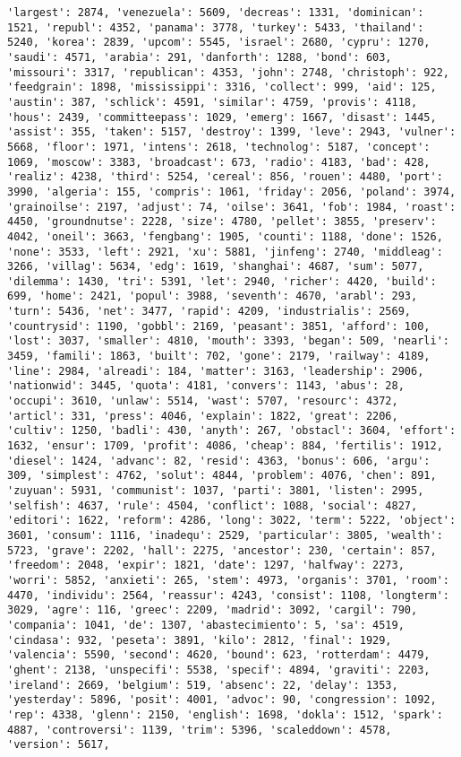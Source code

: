 \documentclass[11pt]{article}
\begin{document}
\begin{Verbatim}[commandchars=\\\{\}]
'largest': 2874, 'venezuela': 5609, 'decreas': 1331, 'dominican': 1521, 'republ': 4352, 'panama': 3778, 'turkey': 5433, 'thailand': 5240, 'korea': 2839, 'upcom': 5545, 'israel': 2680, 'cypru': 1270, 'saudi': 4571, 'arabia': 291, 'danforth': 1288, 'bond': 603, 'missouri': 3317, 'republican': 4353, 'john': 2748, 'christoph': 922, 'feedgrain': 1898, 'mississippi': 3316, 'collect': 999, 'aid': 125, 'austin': 387, 'schlick': 4591, 'similar': 4759, 'provis': 4118, 'hous': 2439, 'committeepass': 1029, 'emerg': 1667, 'disast': 1445, 'assist': 355, 'taken': 5157, 'destroy': 1399, 'leve': 2943, 'vulner': 5668, 'floor': 1971, 'intens': 2618, 'technolog': 5187, 'concept': 1069, 'moscow': 3383, 'broadcast': 673, 'radio': 4183, 'bad': 428, 'realiz': 4238, 'third': 5254, 'cereal': 856, 'rouen': 4480, 'port': 3990, 'algeria': 155, 'compris': 1061, 'friday': 2056, 'poland': 3974, 'grainoilse': 2197, 'adjust': 74, 'oilse': 3641, 'fob': 1984, 'roast': 4450, 'groundnutse': 2228, 'size': 4780, 'pellet': 3855, 'preserv': 4042, 'oneil': 3663, 'fengbang': 1905, 'counti': 1188, 'done': 1526, 'none': 3533, 'left': 2921, 'xu': 5881, 'jinfeng': 2740, 'middleag': 3266, 'villag': 5634, 'edg': 1619, 'shanghai': 4687, 'sum': 5077, 'dilemma': 1430, 'tri': 5391, 'let': 2940, 'richer': 4420, 'build': 699, 'home': 2421, 'popul': 3988, 'seventh': 4670, 'arabl': 293, 'turn': 5436, 'net': 3477, 'rapid': 4209, 'industrialis': 2569, 'countrysid': 1190, 'gobbl': 2169, 'peasant': 3851, 'afford': 100, 'lost': 3037, 'smaller': 4810, 'mouth': 3393, 'began': 509, 'nearli': 3459, 'famili': 1863, 'built': 702, 'gone': 2179, 'railway': 4189, 'line': 2984, 'alreadi': 184, 'matter': 3163, 'leadership': 2906, 'nationwid': 3445, 'quota': 4181, 'convers': 1143, 'abus': 28, 'occupi': 3610, 'unlaw': 5514, 'wast': 5707, 'resourc': 4372, 'articl': 331, 'press': 4046, 'explain': 1822, 'great': 2206, 'cultiv': 1250, 'badli': 430, 'anyth': 267, 'obstacl': 3604, 'effort': 1632, 'ensur': 1709, 'profit': 4086, 'cheap': 884, 'fertilis': 1912, 'diesel': 1424, 'advanc': 82, 'resid': 4363, 'bonus': 606, 'argu': 309, 'simplest': 4762, 'solut': 4844, 'problem': 4076, 'chen': 891, 'zuyuan': 5931, 'communist': 1037, 'parti': 3801, 'listen': 2995, 'selfish': 4637, 'rule': 4504, 'conflict': 1088, 'social': 4827, 'editori': 1622, 'reform': 4286, 'long': 3022, 'term': 5222, 'object': 3601, 'consum': 1116, 'inadequ': 2529, 'particular': 3805, 'wealth': 5723, 'grave': 2202, 'hall': 2275, 'ancestor': 230, 'certain': 857, 'freedom': 2048, 'expir': 1821, 'date': 1297, 'halfway': 2273, 'worri': 5852, 'anxieti': 265, 'stem': 4973, 'organis': 3701, 'room': 4470, 'individu': 2564, 'reassur': 4243, 'consist': 1108, 'longterm': 3029, 'agre': 116, 'greec': 2209, 'madrid': 3092, 'cargil': 790, 'compania': 1041, 'de': 1307, 'abastecimiento': 5, 'sa': 4519, 'cindasa': 932, 'peseta': 3891, 'kilo': 2812, 'final': 1929, 'valencia': 5590, 'second': 4620, 'bound': 623, 'rotterdam': 4479, 'ghent': 2138, 'unspecifi': 5538, 'specif': 4894, 'graviti': 2203, 'ireland': 2669, 'belgium': 519, 'absenc': 22, 'delay': 1353, 'yesterday': 5896, 'posit': 4001, 'advoc': 90, 'congression': 1092, 'rep': 4338, 'glenn': 2150, 'english': 1698, 'dokla': 1512, 'spark': 4887, 'controversi': 1139, 'trim': 5396, 'scaleddown': 4578, 'version': 5617, 
\end{Verbatim}
\end{document}
